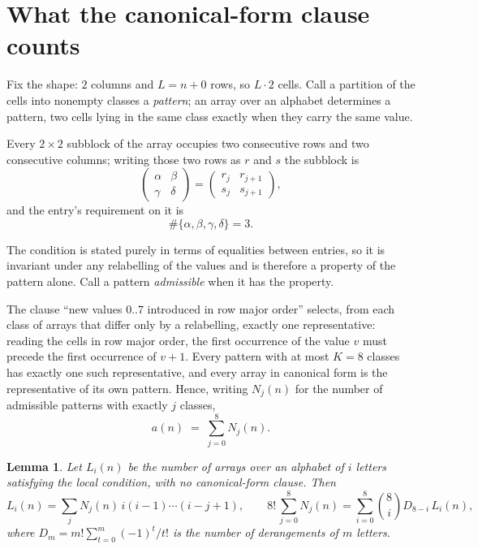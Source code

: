 \documentclass[11pt,a4paper]{article}
\theoremstyle{plain}
\newtheorem{lemma}[theorem]{Lemma}
\theoremstyle{definition}
\begin{document}
\section{What the canonical-form clause counts}

Fix the shape: $2$ columns and $L=n+0$ rows, so $L\cdot2$ cells. Call a
partition of the cells into nonempty classes a \emph{pattern}; an array over an alphabet
determines a pattern, two cells lying in the same class exactly when they carry the same
value.

Every $2\times2$ subblock of the array occupies two consecutive
rows and two consecutive columns; writing those two rows as $r$ and $s$ the
subblock is
\[
\begin{pmatrix}\alpha&\beta\\\gamma&\delta\end{pmatrix}=\begin{pmatrix}r_j&r_{j+1}\\s_j&s_{j+1}\end{pmatrix},
\]
and the entry's requirement on it is
\begin{equation}\label{eq:loc}
\#\{\alpha,\beta,\gamma,\delta\}=3.
\end{equation}

The condition is stated purely in terms of equalities between entries, so it is invariant
under any relabelling of the values and is therefore a property of the pattern alone. Call a
pattern \emph{admissible} when it has the property.

The clause ``new values $0..7$ introduced in row major order'' selects, from each class
of arrays that differ only by a relabelling, exactly one representative: reading the cells in
row major order, the first occurrence of the value $v$ must precede the first occurrence of
$v+1$. Every pattern with at most $K=8$ classes has exactly one such representative, and
every array in canonical form is the representative of its own pattern. Hence, writing
$N_j(n)$ for the number of admissible patterns with exactly $j$ classes,
\begin{equation}\label{eq:apat}
a(n)\;=\;\sum_{j=0}^{8}N_j(n).
\end{equation}

\begin{lemma}\label{lem:inv}
Let $L_i(n)$ be the number of arrays over an alphabet of $i$ letters satisfying the local
condition, with no canonical-form clause. Then
\[
L_i(n)=\sum_j N_j(n)\,i(i-1)\cdots(i-j+1),
\qquad
8!\,\sum_{j=0}^{8}N_j(n)=\sum_{i=0}^{8}\binom{8}{i}D_{8-i}\,L_i(n),
\]
where $D_m=m!\sum_{t=0}^{m}(-1)^t/t!$ is the number of derangements of $m$ letters.
\end{lemma}
\end{document}
